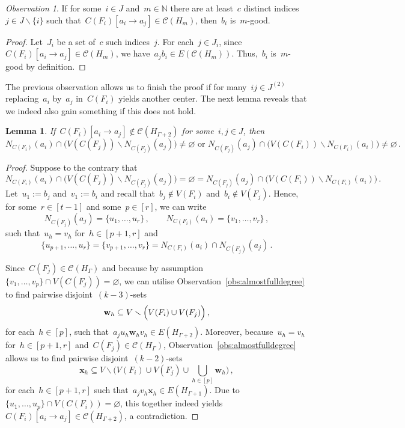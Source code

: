 \documentclass[oneside, 12pt]{amsart}
\numberwithin{equation}{section}
\numberwithin{figure}{section}
\let\emptyset=\varnothing
\let\setminus=\smallsetminus
\newcommand{\cC}{\mathcal{C}}
\theoremstyle{plain}
\newtheorem{lemma}[theorem]{Lemma}
\theoremstyle{note}
\theoremstyle{remark}
\newtheorem{observation}[theorem]{Observation}
\begin{document}
	\begin{observation}\label{obs:manyalternatives+good}
		If for some~$i\in J$ and~$m\in\mathds{N}$ there are at least~$c$ distinct indices~$j\in J\setminus\{i\}$ such that~$C(F_i)[a_i \to a_j]\in\cC(H_m)$, then~$b_i$ is~$m$-good.
	\end{observation}
	
	\begin{proof}
		Let~$J_i$ be a set of~$c$ such indices~$j$.
		For each~$j\in J_i$, since~$C(F_i)[a_i\to a_j]\in\cC(H_m)$, we have~$a_jb_i\in E(\cC(H_m))$.
        Thus,~$b_i$ is~$m$-good by definition.
	\end{proof}
	
    The previous observation allows us to finish the proof if for many~$ij\in J^{(2)}$ replacing~$a_i$ by~$a_j$ in~$C(F_i)$ yields another center.
    The next lemma reveals that we indeed also gain something if this does not hold.
    
	\begin{lemma}\label{lem:cannotreplace}
		If~$C(F_i)[a_i \to a_j]\notin\cC(H_{\Gamma+2})$ for some~$i,j\in J$, then
		\[
		N_{C(F_i)}(a_i)\cap\bigl(V(C(F_j))\setminus N_{C(F_j)}(a_j)\bigr)\neq\emptyset
		\text{ or }
		N_{C(F_j)}(a_j)\cap\bigl(V(C(F_i))\setminus N_{C(F_i)}(a_i)\bigr)\neq\emptyset\,.
		\]
	\end{lemma}
	
	\begin{proof}
		Suppose to the contrary that $$N_{C(F_i)}(a_i)\cap\bigl(V(C(F_j))\setminus N_{C(F_j)}(a_j)\bigr)=\emptyset=N_{C(F_j)}(a_j)\cap\bigl(V(C(F_i))\setminus N_{C(F_i)}(a_i)\bigr)\,.$$
		Let~$u_1:=b_j$ and~$v_1:=b_i$ and recall that~$b_j\notin V(F_i)$ and~$b_i\notin V(F_j)$.
		Hence, for some~$r\in[t-1]$ and some~$p\in[r]$, we can write
		\[
		N_{C(F_j)}(a_j)=\{u_1,\ldots,u_r\}\,,\qquad
		N_{C(F_i)}(a_i)=\{v_1,\ldots,v_r\}\,,
		\]
		such that~$u_h=v_h$ for~$h\in[p+1,r]$ and $$\{u_{p+1},\dots,u_{r}\}=\{v_{p+1},\dots,v_{r}\}=N_{C(F_i)}(a_i)\cap N_{C(F_j)}(a_j)\,.$$

		 Since~$C(F_j)\in\cC(H_{\Gamma})$ and because by assumption~$\{v_1,\dots,v_p\}\cap V(C(F_j))=\emptyset$, we can utilise Observation~\ref{obs:almostfulldegree} to find pairwise disjoint~$(k-3)$-sets
		\[
		\mathbf w_h
		\subseteq V\setminus
		\Bigl(V(F_i)\cup V(F_j)\Bigr)\,,
		\]
		for each~$h\in[p]$, such that~$a_ju_h\mathbf w_hv_h\in E(H_{\Gamma+2})$.
        Moreover, because~$u_h=v_h$ for~$h\in[p+1,r]$ and~$C(F_j)\in\cC(H_{\Gamma})$, Observation~\ref{obs:almostfulldegree} allows us to find pairwise disjoint~$(k-2)$-sets $$\mathbf{x}_h\subseteq V\setminus\Big(V(F_i)\cup V(F_j)\cup\bigcup_{h\in[p]}\mathbf{w}_h\Big)\,,$$ for each~$h\in[p+1,r]$ such that~$a_jv_h\mathbf{x}_h\in E(H_{\Gamma+1})$.
    	Due to~$\{u_1,\dots,u_p\}\cap V(C(F_i))=\emptyset$, this together indeed yields~$C(F_i)[a_i\to a_j]\in\cC(H_{\Gamma+2})$, a contradiction.
	\end{proof}
\end{document}
